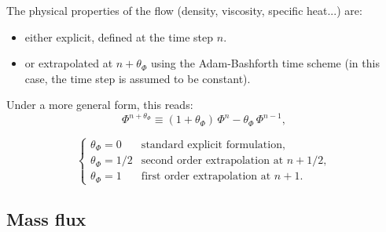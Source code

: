 The physical properties of the flow (density, viscosity, specific heat...)
are:

\begin{itemize}
\item either explicit, defined at the time step $n$.
\item or extrapolated at $n+\theta _{\Phi }$ using the Adam-Bashforth
time scheme (in this case, the time step is assumed to be constant).
\end{itemize}

Under a more general form, this reads:
\begin{equation}
 \Phi^{n+\theta_{\Phi}} \equiv(1+\theta_{\Phi})\,\Phi^{n}- \theta_{\Phi}\,\Phi^{n-1},
\end{equation}

\begin{equation}
\left\{%
\begin{array}{ll}
\theta_{\Phi} = 0 & \text{standard explicit formulation} ,\\
\theta_{\Phi} = 1/2 & \text{second order extrapolation at } n+1/2, \\
\theta_{\Phi} = 1 & \text{first order extrapolation at } n+1.
\end{array}
\right.
\end{equation}

\subsection{Mass flux}

